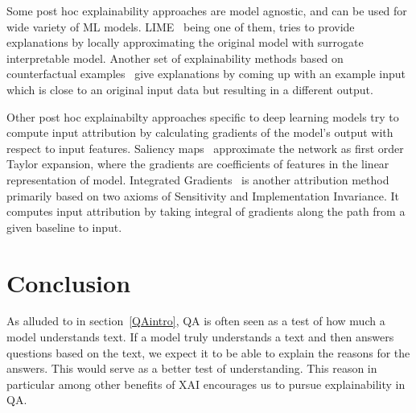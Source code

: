 \documentclass[10pt,twocolumn,letterpaper]{article}
\begin{document}
Some post hoc explainability approaches are model agnostic, and can be used for wide variety of ML models. LIME~\cite{lime} being one of them, tries to provide explanations by locally approximating the original model with surrogate interpretable model. Another set of explainability methods based on counterfactual examples~\cite{counterfactual} give explanations by coming up with an example input which is close to an original input data but resulting in a different output.

Other post hoc explainabilty approaches specific to deep learning models try to compute input attribution by calculating gradients of the model's output with respect to input features. Saliency maps~\cite{Saliency} approximate the network as first order Taylor expansion, where the gradients are coefficients of features in the linear representation of model. Integrated Gradients~\cite{IG} is another attribution method primarily based on two axioms of Sensitivity and Implementation Invariance. It computes input attribution by taking integral of gradients along the path from a given baseline to input.

\section{Conclusion}
As alluded to in section~\ref{QAintro}, QA is often seen as a test of how much a model understands text. If a model truly understands a text and then answers questions based on the text, we expect it to be able to explain the reasons for the answers. This would serve as a better test of understanding. This reason in particular among other benefits of XAI encourages us to pursue explainability in QA. 


{\small


}
\end{document}
